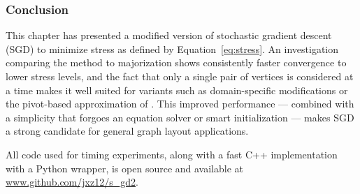 \subsubsection{Conclusion}
This chapter has presented a modified version of stochastic gradient descent (SGD) to minimize stress as defined by Equation~\eqref{eq:stress}. An investigation comparing the method to majorization shows consistently faster convergence to lower stress levels, and the fact that only a single pair of vertices is considered at a time makes it well suited for variants such as domain-specific modifications or the pivot-based approximation of \citet{Ortmann2017}.
This improved performance --- combined with a simplicity that forgoes an equation solver or smart initialization --- makes
SGD a strong candidate for general graph layout applications.

All code used for timing experiments, along with a fast C++ implementation with a Python wrapper, is open source and available at \url{www.github.com/jxz12/s_gd2}.%